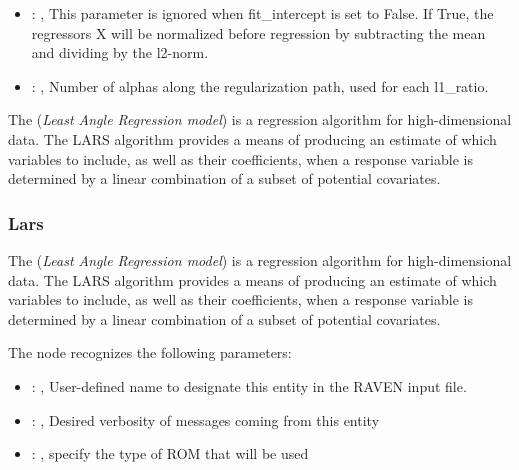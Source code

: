 \begin{itemize}
    \item {}: , 
      This parameter is ignored when fit\_intercept is set to False. If True,
      the regressors X will be normalized before regression by subtracting the mean and
      dividing by the l2-norm.

    \item {}: , 
      Number of alphas along the regularization path,
      used for each l1\_ratio.
  \end{itemize}
 The  (\textit{Least Angle Regression model})                         is a regression
 algorithm for high-dimensional data.                         The LARS algorithm provides a means of
 producing an estimate of which variables                         to include, as well as their
 coefficients, when a response variable is                         determined by a linear
 combination of a subset of potential covariates.

\subsubsection{Lars}
  The  (\textit{Least Angle Regression model})                         is a regression
  algorithm for high-dimensional data.                         The LARS algorithm provides a means
  of producing an estimate of which variables                         to include, as well as their
  coefficients, when a response variable is                         determined by a linear
  combination of a subset of potential covariates.

  The  node recognizes the following parameters:
    \begin{itemize}
      \item {}: , 
        User-defined name to designate this entity in the RAVEN input file.
      \item {}: , 
        Desired verbosity of messages coming from this entity
      \item {}: , 
        specify the type of ROM that will be used
  \end{itemize}

